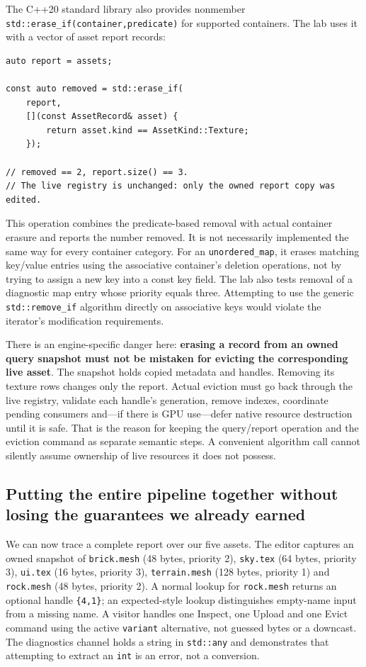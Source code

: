The C++20 standard library also provides nonmember \texttt{std::erase\_if(container,predicate)} for supported containers. The lab uses it with a vector of asset report records:

\begin{verbatim}
auto report = assets;

const auto removed = std::erase_if(
    report,
    [](const AssetRecord& asset) {
        return asset.kind == AssetKind::Texture;
    });

// removed == 2, report.size() == 3.
// The live registry is unchanged: only the owned report copy was edited.
\end{verbatim}

This operation combines the predicate-based removal with actual container erasure and reports the number removed. It is not necessarily implemented the same way for every container category. For an \texttt{unordered\_map}, it erases matching key/value entries using the associative container's deletion operations, not by trying to assign a new key into a const key field. The lab also tests removal of a diagnostic map entry whose priority equals three. Attempting to use the generic \texttt{std::remove\_if} algorithm directly on associative keys would violate the iterator's modification requirements.

There is an engine-specific danger here: \textbf{erasing a record from an owned query snapshot must not be mistaken for evicting the corresponding live asset}. The snapshot holds copied metadata and handles. Removing its texture rows changes only the report. Actual eviction must go back through the live registry, validate each handle's generation, remove indexes, coordinate pending consumers and---if there is GPU use---defer native resource destruction until it is safe. That is the reason for keeping the query/report operation and the eviction command as separate semantic steps. A convenient algorithm call cannot silently assume ownership of live resources it does not possess.

\subsection{Putting the entire pipeline together without losing the guarantees we already earned}\label{05-engine-i-ch006-putting-the-entire-pipeline-together-without-losing-the-guarantees-we-already-earned}

We can now trace a complete report over our five assets. The editor captures an owned snapshot of \texttt{brick.mesh} (48 bytes, priority 2), \texttt{sky.tex} (64 bytes, priority 3), \texttt{ui.tex} (16 bytes, priority 3), \texttt{terrain.mesh} (128 bytes, priority 1) and \texttt{rock.mesh} (48 bytes, priority 2). A normal lookup for \texttt{rock.mesh} returns an optional handle \texttt{\{4,1\}}; an expected-style lookup distinguishes empty-name input from a missing name. A visitor handles one Inspect, one Upload and one Evict command using the active \texttt{variant} alternative, not guessed bytes or a downcast. The diagnostics channel holds a string in \texttt{std::any} and demonstrates that attempting to extract an \texttt{int} is an error, not a conversion.

